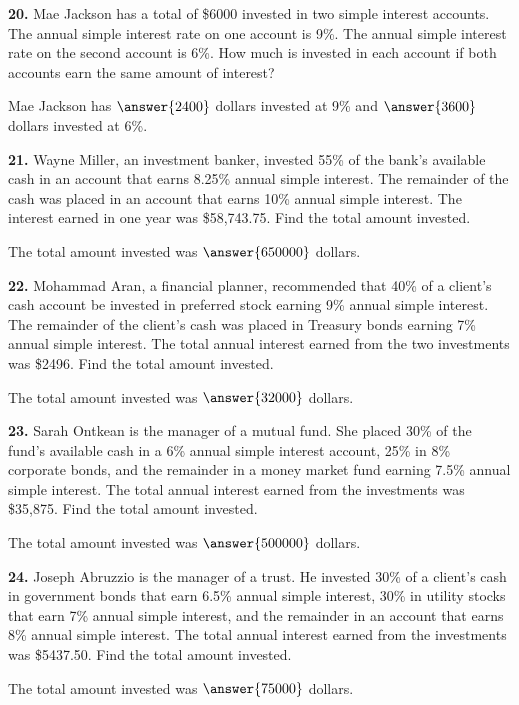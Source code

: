 \documentclass{ximera}
\begin{document}
\begin{problem}
\textbf{20.} Mae Jackson has a total of \$6000 invested in two simple interest accounts. The
  annual simple interest rate on one account is 9\%. The annual simple interest rate on
  the second account is 6\%. How much is invested in each account if both accounts earn
  the same amount of interest?

Mae Jackson has \(\answer{2400}\) dollars invested at 9\% and \(\answer{3600}\) dollars invested at 6\%.
\end{problem}

\begin{problem}
\textbf{21.} Wayne Miller, an investment banker, invested 55\% of the bank's available cash in
  an account that earns 8.25\% annual simple interest. The remainder of the cash was
  placed in an account that earns 10\% annual simple interest. The interest earned in one
  year was \$58,743.75. Find the total amount invested.

The total amount invested was \( \answer{650000} \) dollars.
\end{problem}

\begin{problem}
\textbf{22.} Mohammad Aran, a financial planner, recommended that 40\% of a client's cash
  account be invested in preferred stock earning 9\% annual simple interest. The
  remainder of the client's cash was placed in Treasury bonds earning 7\% annual simple
  interest. The total annual interest earned from the two investments was \$2496. Find
  the total amount invested.

The total amount invested was \( \answer{32000} \) dollars.
\end{problem}

\begin{problem}
\textbf{23.} Sarah Ontkean is the manager of a mutual fund. She placed 30\% of the fund's
  available cash in a 6\% annual simple interest account, 25\% in 8\% corporate bonds,
  and the remainder in a money market fund earning 7.5\% annual simple interest. The
  total annual interest earned from the investments was \$35,875. Find the total amount
  invested.

The total amount invested was \( \answer{500000} \) dollars.
\end{problem}

\begin{problem}
\textbf{24.} Joseph Abruzzio is the manager of a trust. He invested 30\% of a client's cash in
  government bonds that earn 6.5\% annual simple interest, 30\% in utility stocks that
  earn 7\% annual simple interest, and the remainder in an account that earns 8\% annual
  simple interest. The total annual interest earned from the investments was \$5437.50.
  Find the total amount invested.

The total amount invested was  \( \answer{75000} \) dollars.
\end{problem}
\end{document}

